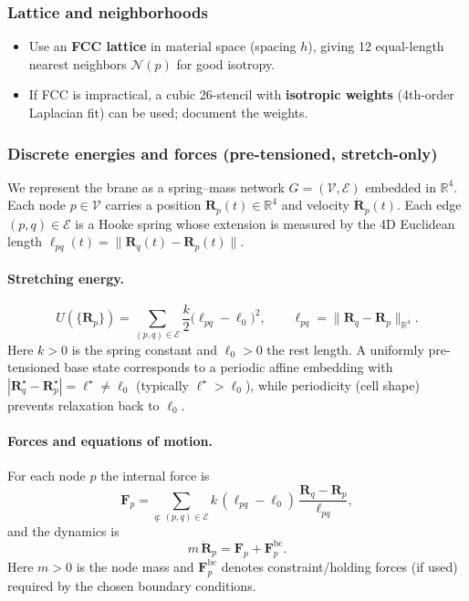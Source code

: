 \subsubsection{Lattice and neighborhoods}\label{lattice-and-neighborhoods}

\begin{itemize}
\item Use an \textbf{FCC lattice} in material space (spacing $h$), giving 12 equal-length nearest neighbors $\mathcal N(p)$ for good isotropy.
\item If FCC is impractical, a cubic 26-stencil with \textbf{isotropic weights} (4th-order Laplacian fit) can be used; document the weights.
\end{itemize}

\subsubsection{Discrete energies and forces (pre-tensioned, stretch-only)}\label{discrete-energies-and-forces}

We represent the brane as a spring--mass network $G=(\mathcal V,\mathcal E)$ embedded in $\mathbb R^4$.
Each node $p\in\mathcal V$ carries a position $\mathbf R_p(t)\in\mathbb R^4$ and velocity $\dot{\mathbf R}_p(t)$.
Each edge $(p,q)\in\mathcal E$ is a Hooke spring whose extension is measured by the 4D Euclidean length
$\ell_{pq}(t)=\|\mathbf R_q(t)-\mathbf R_p(t)\|$.

\paragraph{Stretching energy.}
\begin{equation}
U(\{\mathbf R_p\})
=\sum_{(p,q)\in\mathcal E}\frac{k}{2}\big(\ell_{pq}-\ell_0\big)^2,
\qquad
\ell_{pq}=\|\mathbf R_q-\mathbf R_p\|_{\mathbb R^4}.
\label{eq:discrete-stretch-energy}
\end{equation}
Here $k>0$ is the spring constant and $\ell_0>0$ the rest length.
A uniformly pre-tensioned base state corresponds to a periodic affine embedding with
$|\mathbf R^\star_q-\mathbf R^\star_p|=\ell^\star\neq \ell_0$ (typically $\ell^\star>\ell_0$),
while periodicity (cell shape) prevents relaxation back to $\ell_0$.

\paragraph{Forces and equations of motion.}
For each node $p$ the internal force is
\begin{equation}
\mathbf F_p
=
\sum_{q:\,(p,q)\in\mathcal E}
k\,(\ell_{pq}-\ell_0)\,\frac{\mathbf R_q-\mathbf R_p}{\ell_{pq}},
\label{eq:discrete-force}
\end{equation}
and the dynamics is
\begin{equation}
m\,\ddot{\mathbf R}_p=\mathbf F_p+\mathbf F^{\mathrm{bc}}_p.
\label{eq:discrete-eom}
\end{equation}
Here $m>0$ is the node mass and $\mathbf F^{\mathrm{bc}}_p$ denotes constraint/holding forces (if used) required by the
chosen boundary conditions.


